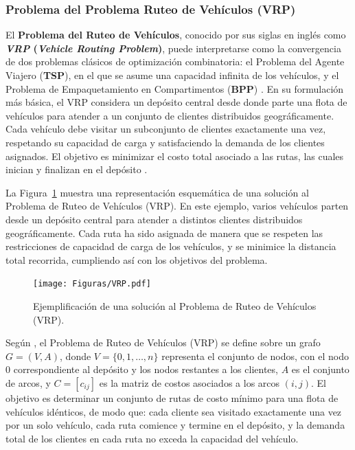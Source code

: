 \documentclass[12pt,titlepage,twoside,openright]{book}
\begin{document}
\subsubsection{Problema del Problema Ruteo de Vehículos (VRP)}
\label{subsec:problem_vrp}


El \textbf{Problema del Ruteo de Vehículos}, conocido por sus siglas en inglés como \textbf{\textit{VRP} (\emph{Vehicle Routing Problem})}, puede interpretarse como la convergencia de dos problemas clásicos de optimización combinatoria: el Problema del Agente Viajero (\textbf{TSP}), en el que se asume una capacidad infinita de los vehículos, y el Problema de Empaquetamiento en Compartimentos (\textbf{BPP}) \cite{daza2009}. En su formulación más básica, el VRP considera un depósito central desde donde parte una flota de vehículos para atender a un conjunto de clientes distribuidos geográficamente. Cada vehículo debe visitar un subconjunto de clientes exactamente una vez, respetando su capacidad de carga y satisfaciendo la demanda de los clientes asignados. El objetivo es minimizar el costo total asociado a las rutas, las cuales inician y finalizan en el depósito \cite{montes2017}.

La Figura~\ref{fig:vrp} muestra una representación esquemática de una solución al Problema de Ruteo de Vehículos (VRP). En este ejemplo, varios vehículos parten desde un depósito central para atender a distintos clientes distribuidos geográficamente. Cada ruta ha sido asignada de manera que se respeten las restricciones de capacidad de carga de los vehículos, y se minimice la distancia total recorrida, cumpliendo así con los objetivos del problema.\begin{figure}[H]
	\centering
	\texttt{[image: Figuras/VRP.pdf]}
	\caption{Ejemplificación de una solución al Problema de Ruteo de Vehículos (VRP).}
	\label{fig:vrp}
\end{figure}

Según \citep{toth2014}, el Problema de Ruteo de Vehículos (VRP) se define sobre un grafo $G = (V, A)$, donde $V = \{0, 1, \dots, n\}$ representa el conjunto de nodos, con el nodo $0$ correspondiente al depósito y los nodos restantes a los clientes, $A$ es el conjunto de arcos, y $C = [c_{ij}]$ es la matriz de costos asociados a los arcos $(i, j)$. El objetivo es determinar un conjunto de rutas de costo mínimo para una flota de vehículos idénticos, de modo que: cada cliente sea visitado exactamente una vez por un solo vehículo, cada ruta comience y termine en el depósito, y la demanda total de los clientes en cada ruta no exceda la capacidad del vehículo.
\end{document}
